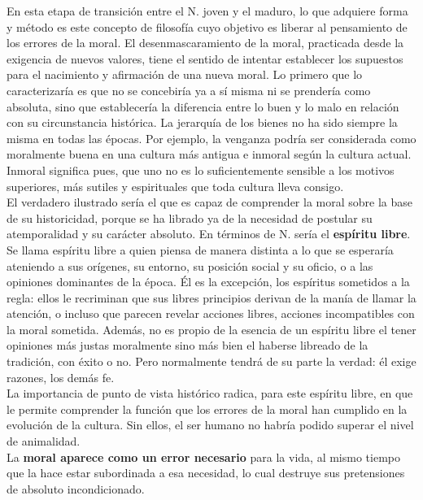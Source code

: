 \documentclass[a4paper, 10pt, twocolumn, spanish]{article}
\begin{document}
En esta etapa de transición entre el N. joven y el maduro, lo que
adquiere forma y método es este concepto de filosofía cuyo objetivo es
liberar al pensamiento de los errores de la moral. El
desenmascaramiento de la moral, practicada desde la exigencia de
nuevos valores, tiene el sentido de intentar establecer los supuestos
para el nacimiento y afirmación de una nueva moral. Lo primero que lo
caracterizaría es que no se concebiría ya a sí misma ni se prendería
como absoluta, sino que establecería la diferencia entre lo buen y lo
malo en relación con su circunstancia histórica. La jerarquía de los
bienes no ha sido siempre la misma en todas las épocas. Por ejemplo,
la venganza podría ser considerada como moralmente buena en una
cultura más antigua e inmoral según la cultura actual.\\[0pt]
Inmoral significa pues, que uno no es lo suficientemente sensible a
los motivos superiores, más sutiles y espirituales que toda cultura
lleva consigo.\\[0pt]
El verdadero ilustrado sería el que es capaz de comprender la moral
sobre la base de su historicidad, porque se ha librado ya de la
necesidad de postular su atemporalidad y su carácter absoluto. En
términos de N. sería el \textbf{espíritu libre}.\\[0pt]

Se llama espíritu libre a quien piensa de manera distinta a lo que se
esperaría ateniendo a sus orígenes, su entorno, su posición social y
su oficio, o a las opiniones dominantes de la época. Él es la
excepción, los espíritus sometidos a la regla: ellos le recriminan que
sus libres principios derivan de la manía de llamar la atención, o
incluso que parecen revelar acciones libres, acciones incompatibles
con la moral sometida. Además, no es propio de la esencia de un
espíritu libre el tener opiniones más justas moralmente sino más bien
el haberse libreado de la tradición, con éxito o no. Pero normalmente
tendrá de su parte la verdad: él exige razones, los demás fe.\\[0pt]

La importancia de punto de vista histórico radica, para este espíritu
libre, en que le permite comprender la función que los errores de la
moral han cumplido en la evolución de la cultura. Sin ellos, el ser
humano no habría podido superar el nivel de animalidad.\\[0pt]
La \textbf{moral aparece como un error necesario} para la vida, al mismo
tiempo que la hace estar subordinada a esa necesidad, lo cual destruye
sus pretensiones de absoluto incondicionado.
\end{document}
